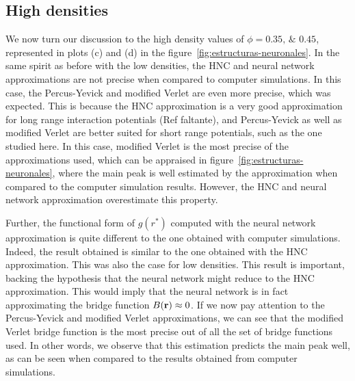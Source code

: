 \subsection{High densities}
We now turn our discussion to the high density values of $\phi=\numlist{0.35; 0.45}$,
represented in plots (c) and (d) in the figure~\ref{fig:estructuras-neuronales}.
In the same spirit as before with the low densities, the HNC and neural network 
approximations are not precise when compared to computer simulations. In this case,
the Percus-Yevick and modified Verlet are even more precise, which was expected.
This is because the HNC approximation is a very good approximation for long range
interaction potentials (Ref faltante), and Percus-Yevick as well as modified Verlet are 
better suited for short range potentials, such as the one studied here.
In this case, modified Verlet is the most precise of the approximations used, which
can be appraised in figure~\ref{fig:estructuras-neuronales}, where the main peak
is well estimated by the approximation when compared to the computer simulation
results. However, the HNC and neural network approximation overestimate this property.

Further, the functional form of $g(r^*)$ computed with the neural network approximation 
is quite different to the one obtained with computer simulations. Indeed, the result
obtained is similar to the one obtained with the HNC approximation. This was also the
case for low densities. This result is important, backing the hypothesis that the
neural network might reduce to the HNC approximation.
This would imply that the neural network is in fact approximating the bridge function
$B(\mathbf{r}) \approx 0$. If we now pay attention to the Percus-Yevick and modified Verlet
approximations, we can see that the modified Verlet bridge function is the most precise
out of all the set of bridge functions used. In other words, we observe that this
estimation predicts the main peak well, as can be seen when compared to the results
obtained from computer simulations.